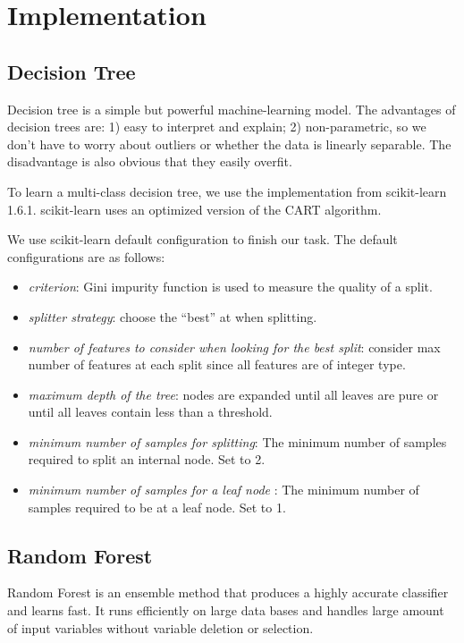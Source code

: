 \documentclass[letterpaper,11pt,twocolumn]{article}
\begin{document}
\section{Implementation}
\label{sec:impl}
\subsection{Decision Tree}
Decision tree is a simple but powerful machine-learning model. The advantages of decision trees are: 1) easy to interpret and explain; 2) non-parametric, so we don't have to worry about outliers or whether the data is linearly separable. The disadvantage is also obvious that they easily overfit.

To learn a multi-class decision tree, we use the implementation from scikit-learn 1.6.1\cite{scikit}. scikit-learn uses an optimized version of the CART algorithm.

We use scikit-learn default configuration to finish our task. The default configurations are as follows:

\begin{itemize}
\item \emph{criterion}: Gini impurity function is used to measure the quality of a split.
\item \emph{splitter strategy}: choose the “best” at when splitting.
\item \emph{number of features to consider when looking for the best split}: consider max number of features at each split since all features are of integer type.
\item \emph{maximum depth of the tree}: nodes are expanded until all leaves are pure or until all leaves contain less than a threshold.
\item \emph{minimum number of samples for splitting}: The minimum number of samples required to split an internal node. Set to 2.
\item \emph{minimum number of samples for a leaf node }: The minimum number of samples required to be at a leaf node. Set to 1.

\end{itemize}
\subsection{Random Forest}
Random Forest is an ensemble method that produces a highly accurate classifier and learns fast. It runs efficiently on large data bases and handles large amount of input variables without variable deletion or selection.
\end{document}
